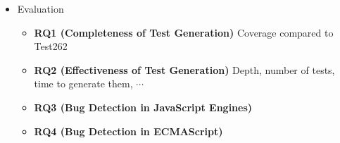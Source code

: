 \begin{itemize}
\item Evaluation
\begin{itemize}
\item {\bf RQ1 (Completeness of Test Generation)}
Coverage compared to Test262
\item {\bf RQ2 (Effectiveness of Test Generation)}
Depth, number of tests, time to generate them, $\cdots$
\item {\bf RQ3 (Bug Detection in JavaScript Engines)}
\item {\bf RQ4 (Bug Detection in ECMAScript)}
\end{itemize}
\end{itemize}
